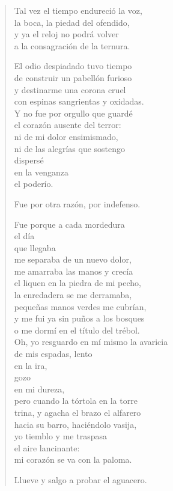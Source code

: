 \documentclass[12pt]{article}
\begin{document}
\begin{verse}
Tal vez el tiempo endureció la voz,\\
la boca, la piedad del ofendido,\\
y ya el reloj no podrá volver\\
a la consagración de la ternura.  

El odio despiadado tuvo tiempo\\
de construir un pabellón furioso\\
y destinarme una corona cruel\\
con espinas sangrientas y oxidadas.\\
Y no fue por orgullo que guardé\\
el corazón ausente del terror:\\
ni de mi dolor ensimismado,\\
ni de las alegrías que sostengo\\
dispersé\\
en la venganza\\
el poderío.  

Fue por otra razón, por indefenso.  

Fue porque a cada mordedura\\
el día\\
que llegaba\\
me separaba de un nuevo dolor,\\
me amarraba las manos y crecía\\
el liquen en la piedra de mi pecho,\\
la enredadera se me derramaba,\\
pequeñas manos verdes me cubrían,\\
y me fui ya sin puños a los bosques\\
o me dormí en el título del trébol.\\
Oh, yo resguardo en mí mismo la avaricia\\
de mis espadas, lento\\
en la ira,\\
gozo\\
en mi dureza,\\
pero cuando la tórtola en la torre\\
trina, y agacha el brazo el alfarero\\
hacia su barro, haciéndolo vasija,\\
yo tiemblo y me traspasa\\
el aire lancinante:\\
mi corazón se va con la paloma.  

Llueve y salgo a probar el aguacero.  


\end{verse}
\end{document}
